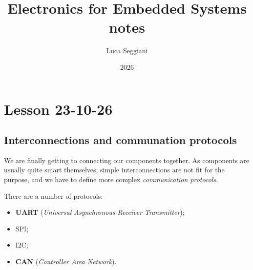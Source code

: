 \documentclass[a4paper,11pt]{article}
\title{Electronics for Embedded Systems notes}
\author{Luca Seggiani}
\date{2026}
\begin{document}
\section{Lesson 23-10-26}

\thispagestyle{empty}
\pagestyle{fancy}

\subsection{Interconnections and communation protocols}

We are finally getting to connecting our components together.
As components are usually quite smart themselves, simple interconnections are not fit for the purpose, and we have to define more complex \textit{communication protocols}.

There are a number of protocols:
\begin{itemize}
	\item \textbf{UART} (\textit{Universal Asynchronous Receiver Transmitter});
	\item SPI;
	\item I2C;
	\item \textbf{CAN} (\textit{Controller Area Network}).
\end{itemize}
\end{document}
